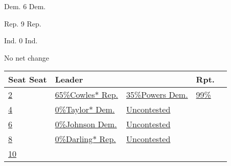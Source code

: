 Dem. 6 Dem.

Rep. 9 Rep.

Ind. 0 Ind.

No net change

\begin{longtable}[]{@{}lllll@{}}
\toprule
Seat Seat & Leader & & Rpt. &\tabularnewline
\midrule
\endhead
\href{//www.nytimes3xbfgragh.onion/elections/2016/results/wisconsin-state-senate-district-2}{2}
&
\href{//www.nytimes3xbfgragh.onion/elections/2016/results/wisconsin-state-senate-district-2}{
65\%Cowles* Rep.} &
\href{//www.nytimes3xbfgragh.onion/elections/2016/results/wisconsin-state-senate-district-2}{
35\%Powers Dem.} &
\href{//www.nytimes3xbfgragh.onion/elections/2016/results/wisconsin-state-senate-district-2}{99\%}
&
\href{//www.nytimes3xbfgragh.onion/elections/2016/results/wisconsin-state-senate-district-2}{}\tabularnewline
\href{//www.nytimes3xbfgragh.onion/elections/2016/results/wisconsin-state-senate-district-4}{4}
&
\href{//www.nytimes3xbfgragh.onion/elections/2016/results/wisconsin-state-senate-district-4}{
0\%Taylor* Dem.} &
\href{//www.nytimes3xbfgragh.onion/elections/2016/results/wisconsin-state-senate-district-4}{Uncontested}
&
\href{//www.nytimes3xbfgragh.onion/elections/2016/results/wisconsin-state-senate-district-4}{}
&
\href{//www.nytimes3xbfgragh.onion/elections/2016/results/wisconsin-state-senate-district-4}{}\tabularnewline
\href{//www.nytimes3xbfgragh.onion/elections/2016/results/wisconsin-state-senate-district-6}{6}
&
\href{//www.nytimes3xbfgragh.onion/elections/2016/results/wisconsin-state-senate-district-6}{
0\%Johnson Dem.} &
\href{//www.nytimes3xbfgragh.onion/elections/2016/results/wisconsin-state-senate-district-6}{Uncontested}
&
\href{//www.nytimes3xbfgragh.onion/elections/2016/results/wisconsin-state-senate-district-6}{}
&
\href{//www.nytimes3xbfgragh.onion/elections/2016/results/wisconsin-state-senate-district-6}{}\tabularnewline
\href{//www.nytimes3xbfgragh.onion/elections/2016/results/wisconsin-state-senate-district-8}{8}
&
\href{//www.nytimes3xbfgragh.onion/elections/2016/results/wisconsin-state-senate-district-8}{
0\%Darling* Rep.} &
\href{//www.nytimes3xbfgragh.onion/elections/2016/results/wisconsin-state-senate-district-8}{Uncontested}
&
\href{//www.nytimes3xbfgragh.onion/elections/2016/results/wisconsin-state-senate-district-8}{}
&
\href{//www.nytimes3xbfgragh.onion/elections/2016/results/wisconsin-state-senate-district-8}{}\tabularnewline
\href{//www.nytimes3xbfgragh.onion/elections/2016/results/wisconsin-state-senate-district-10}{10}
&
\href{//www.nytimes3xbfgragh.onion/elections/2016/results/wisconsin-state-senate-district-10}{
}
\end{longtable}
